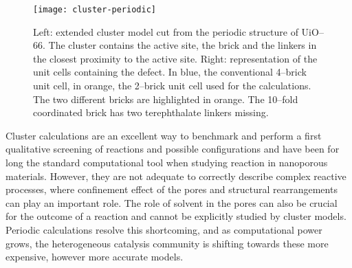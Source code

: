 \begin{figure}[!htbp]
	\centering
 	\texttt{[image: cluster-periodic]}
	\caption{Left: extended cluster model cut from the periodic structure of UiO--66. The cluster contains the active site, the brick and the linkers in the closest proximity to the active site. Right: representation of the unit cells containing the defect. In blue, the conventional 4--brick unit cell, in orange, the 2--brick unit cell used for the calculations. The two different bricks are highlighted in orange. The 10--fold coordinated brick has two terephthalate linkers missing.}
	\label{fig:cluster-periodic}
\end{figure}
\npar
Cluster calculations are an excellent way to benchmark and perform a first qualitative screening of reactions and possible configurations and have been for long the standard computational tool when studying reaction in nanoporous materials. However, they are not adequate to correctly describe complex reactive processes, where confinement effect of the pores and structural rearrangements can play an important role. The role of solvent in the pores can also be crucial for the outcome of a reaction and cannot be explicitly studied by cluster models. Periodic calculations resolve this shortcoming, and as computational power grows, the heterogeneous catalysis community is shifting towards these more expensive, however more accurate models. 

